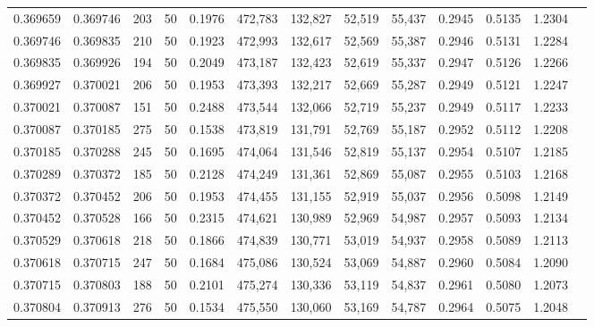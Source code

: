 \begin{tabular}{rrrrrrrrrrrrr}
0.369659 & 0.369746 &   203 &  50 &                                     0.1976 & 472,783 & 132,827 &  52,519 &  55,437 & 0.2945 & 0.5135 & 1.2304 \\
0.369746 & 0.369835 &   210 &  50 &                                     0.1923 & 472,993 & 132,617 &  52,569 &  55,387 & 0.2946 & 0.5131 & 1.2284 \\
0.369835 & 0.369926 &   194 &  50 &                                     0.2049 & 473,187 & 132,423 &  52,619 &  55,337 & 0.2947 & 0.5126 & 1.2266 \\
0.369927 & 0.370021 &   206 &  50 &                                     0.1953 & 473,393 & 132,217 &  52,669 &  55,287 & 0.2949 & 0.5121 & 1.2247 \\
0.370021 & 0.370087 &   151 &  50 &                                     0.2488 & 473,544 & 132,066 &  52,719 &  55,237 & 0.2949 & 0.5117 & 1.2233 \\
0.370087 & 0.370185 &   275 &  50 &                                     0.1538 & 473,819 & 131,791 &  52,769 &  55,187 & 0.2952 & 0.5112 & 1.2208 \\
0.370185 & 0.370288 &   245 &  50 &                                     0.1695 & 474,064 & 131,546 &  52,819 &  55,137 & 0.2954 & 0.5107 & 1.2185 \\
0.370289 & 0.370372 &   185 &  50 &                                     0.2128 & 474,249 & 131,361 &  52,869 &  55,087 & 0.2955 & 0.5103 & 1.2168 \\
0.370372 & 0.370452 &   206 &  50 &                                     0.1953 & 474,455 & 131,155 &  52,919 &  55,037 & 0.2956 & 0.5098 & 1.2149 \\
0.370452 & 0.370528 &   166 &  50 &                                     0.2315 & 474,621 & 130,989 &  52,969 &  54,987 & 0.2957 & 0.5093 & 1.2134 \\
0.370529 & 0.370618 &   218 &  50 &                                     0.1866 & 474,839 & 130,771 &  53,019 &  54,937 & 0.2958 & 0.5089 & 1.2113 \\
0.370618 & 0.370715 &   247 &  50 &                                     0.1684 & 475,086 & 130,524 &  53,069 &  54,887 & 0.2960 & 0.5084 & 1.2090 \\
0.370715 & 0.370803 &   188 &  50 &                                     0.2101 & 475,274 & 130,336 &  53,119 &  54,837 & 0.2961 & 0.5080 & 1.2073 \\
0.370804 & 0.370913 &   276 &  50 &                                     0.1534 & 475,550 & 130,060 &  53,169 &  54,787 & 0.2964 & 0.5075 & 1.2048 \\

\end{tabular}
